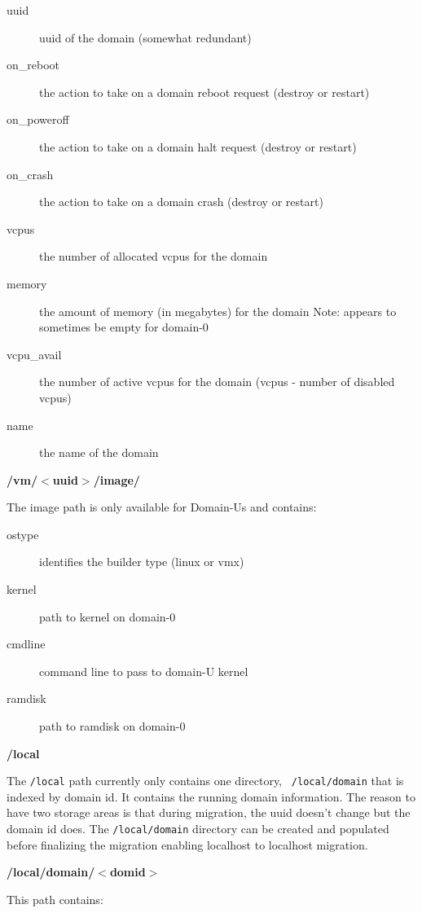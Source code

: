 \documentclass[11pt,twoside,final,openright,a4paper]{report}
\begin{document}
\begin{description}
\item[uuid] uuid of the domain (somewhat redundant)
\item[on\_reboot] the action to take on a domain reboot request (destroy or restart)
\item[on\_poweroff] the action to take on a domain halt request (destroy or restart)
\item[on\_crash] the action to take on a domain crash (destroy or restart)
\item[vcpus] the number of allocated vcpus for the domain
\item[memory] the amount of memory (in megabytes) for the domain Note: appears to sometimes be empty for domain-0
\item[vcpu\_avail] the number of active vcpus for the domain (vcpus - number of disabled vcpus)
\item[name] the name of the domain
\end{description}


{\bf /vm/$<$uuid$>$/image/}

The image path is only available for Domain-Us and contains:
\begin{description}
\item[ostype] identifies the builder type (linux or vmx)
\item[kernel] path to kernel on domain-0
\item[cmdline] command line to pass to domain-U kernel
\item[ramdisk] path to ramdisk on domain-0
\end{description}

{\bf /local}

The {\tt /local} path currently only contains one directory, {\tt
/local/domain} that is indexed by domain id.  It contains the running
domain information.  The reason to have two storage areas is that
during migration, the uuid doesn't change but the domain id does.  The
{\tt /local/domain} directory can be created and populated before
finalizing the migration enabling localhost to localhost migration.

{\bf /local/domain/$<$domid$>$}

This path contains:
\end{document}
